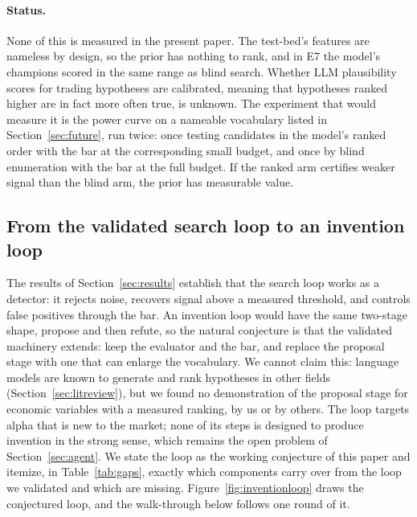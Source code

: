\documentclass[11pt]{article}
\begin{document}
\paragraph{Status.} None of this is measured in the present paper. The test-bed's features are nameless
by design, so the prior has nothing to rank, and in E7 the model's champions scored in the same range as
blind search. Whether
LLM plausibility scores for trading hypotheses are calibrated, meaning that hypotheses ranked higher are
in fact more often true, is unknown. The experiment that would measure it is the power curve on a
nameable vocabulary listed in Section~\ref{sec:future}, run twice: once testing candidates in the model's
ranked order with the bar at the corresponding small budget, and once by blind enumeration with the bar
at the full budget. If the ranked arm certifies weaker signal than the blind arm, the prior has measurable
value.

\subsection{From the validated search loop to an invention loop}
\label{sec:looptoinvention}

The results of Section~\ref{sec:results} establish that the search loop works as a detector: it rejects
noise, recovers signal above a measured threshold, and controls false positives through the bar. An
invention loop would have the same two-stage shape, propose and then refute, so the natural conjecture
is that the validated machinery extends: keep the evaluator and the bar, and replace the proposal stage
with one that can enlarge the vocabulary. We cannot claim this: language models are known to generate
and rank hypotheses in other fields (Section~\ref{sec:litreview}), but we found no demonstration of the
proposal stage for economic variables with a measured ranking, by us or by others. The loop targets
alpha that is new to the market; none of its steps is designed to produce invention in the strong sense,
which remains the open problem of Section~\ref{sec:agent}. We state the loop as the working conjecture of this paper and itemize, in Table~\ref{tab:gaps}, exactly which components carry
over from the loop we validated and which are missing. Figure~\ref{fig:inventionloop} draws the conjectured
loop, and the walk-through below follows one round of it.
\end{document}
